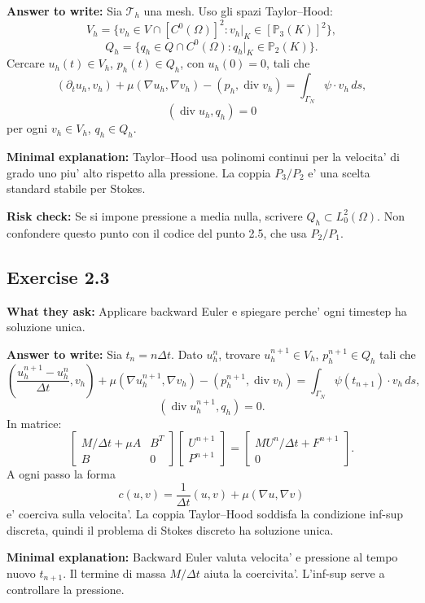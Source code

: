 \documentclass[11pt,a4paper]{article}
\begin{document}
\textbf{Answer to write:}
Sia \(\mathcal T_h\) una mesh. Uso gli spazi Taylor--Hood:
\[
V_h=\{v_h\in V\cap[C^0(\Omega)]^2: v_h|_K\in[\mathbb P_3(K)]^2\},
\]
\[
Q_h=\{q_h\in Q\cap C^0(\Omega): q_h|_K\in\mathbb P_2(K)\}.
\]
Cercare \(u_h(t)\in V_h\), \(p_h(t)\in Q_h\), con \(u_h(0)=0\), tali che
\[
(\partial_t u_h,v_h)+\mu(\nabla u_h,\nabla v_h)
-(p_h,\operatorname{div}v_h)
=\int_{\Gamma_N}\psi\cdot v_h\,ds,
\]
\[
(\operatorname{div}u_h,q_h)=0
\]
per ogni \(v_h\in V_h\), \(q_h\in Q_h\).

\textbf{Minimal explanation:}
Taylor--Hood usa polinomi continui per la velocita' di grado uno piu' alto rispetto alla pressione. La coppia \(P_3/P_2\) e' una scelta standard stabile per Stokes.

\textbf{Risk check:}
Se si impone pressione a media nulla, scrivere \(Q_h\subset L^2_0(\Omega)\). Non confondere questo punto con il codice del punto 2.5, che usa \(P_2/P_1\).

\subsection*{Exercise 2.3}
\textbf{What they ask:} Applicare backward Euler e spiegare perche' ogni timestep ha soluzione unica.

\textbf{Answer to write:}
Sia \(t_n=n\Delta t\). Dato \(u_h^n\), trovare \(u_h^{n+1}\in V_h\), \(p_h^{n+1}\in Q_h\) tali che
\[
\left(\frac{u_h^{n+1}-u_h^n}{\Delta t},v_h\right)
+\mu(\nabla u_h^{n+1},\nabla v_h)
-(p_h^{n+1},\operatorname{div}v_h)
=\int_{\Gamma_N}\psi(t_{n+1})\cdot v_h\,ds,
\]
\[
(\operatorname{div}u_h^{n+1},q_h)=0.
\]
In matrice:
\[
\begin{bmatrix}
M/\Delta t+\mu A & B^T\\
B & 0
\end{bmatrix}
\begin{bmatrix}
U^{n+1}\\ P^{n+1}
\end{bmatrix}
=
\begin{bmatrix}
MU^n/\Delta t+F^{n+1}\\ 0
\end{bmatrix}.
\]
A ogni passo la forma
\[
c(u,v)=\frac1{\Delta t}(u,v)+\mu(\nabla u,\nabla v)
\]
e' coerciva sulla velocita'. La coppia Taylor--Hood soddisfa la condizione inf-sup discreta, quindi il problema di Stokes discreto ha soluzione unica.

\textbf{Minimal explanation:}
Backward Euler valuta velocita' e pressione al tempo nuovo \(t_{n+1}\). Il termine di massa \(M/\Delta t\) aiuta la coercivita'. L'inf-sup serve a controllare la pressione.
\end{document}
